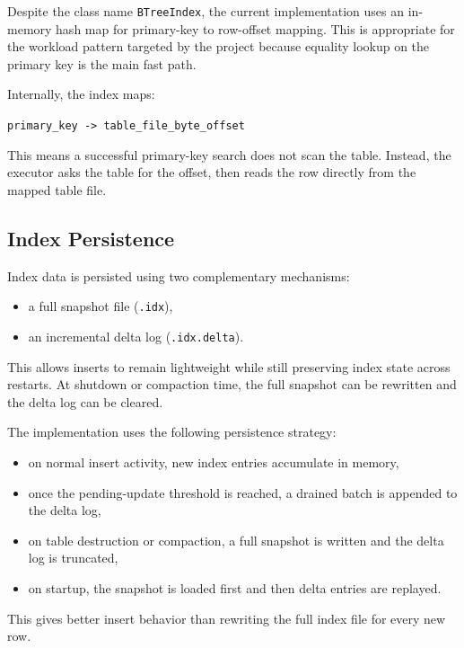 \documentclass[12pt,a4paper]{article}
\begin{document}
Despite the class name \texttt{BTreeIndex}, the current implementation uses an
in-memory hash map for primary-key to row-offset mapping. This is appropriate
for the workload pattern targeted by the project because equality lookup on the
primary key is the main fast path.

Internally, the index maps:

\begin{center}
\texttt{primary\_key -> table\_file\_byte\_offset}
\end{center}

This means a successful primary-key search does not scan the table. Instead,
the executor asks the table for the offset, then reads the row directly from
the mapped table file.

\subsection{Index Persistence}

Index data is persisted using two complementary mechanisms:

\begin{itemize}[leftmargin=1.8em]
  \item a full snapshot file (\texttt{.idx}),
  \item an incremental delta log (\texttt{.idx.delta}).
\end{itemize}

This allows inserts to remain lightweight while still preserving index state
across restarts. At shutdown or compaction time, the full snapshot can be
rewritten and the delta log can be cleared.

The implementation uses the following persistence strategy:

\begin{itemize}[leftmargin=1.8em]
  \item on normal insert activity, new index entries accumulate in memory,
  \item once the pending-update threshold is reached, a drained batch is
        appended to the delta log,
  \item on table destruction or compaction, a full snapshot is written and the
        delta log is truncated,
  \item on startup, the snapshot is loaded first and then delta entries are
        replayed.
\end{itemize}

This gives better insert behavior than rewriting the full index file for every
new row.
\end{document}
